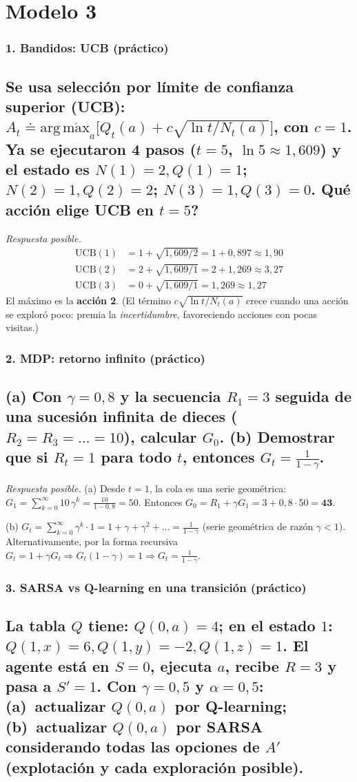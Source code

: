 \documentclass[11pt, a4paper]{article}
\newcommand{\pregunta}[1]{\subsection{#1}}
\newcommand{\eje}[1]{\subsubsection{#1}}
\newcommand{\argmax}{\operatorname*{arg\,m\acute{a}x}}
\begin{document}
\section{Modelo 3}

\eje{1. Bandidos: UCB (pr\'actico)}
\pregunta{Se usa selecci\'on por l\'imite de confianza superior (UCB): $A_t \doteq \argmax_a\big[Q_t(a) + c\sqrt{\ln t / N_t(a)}\big]$, con $c=1$. Ya se ejecutaron 4 pasos ($t=5$, $\ln 5 \approx 1{,}609$) y el estado es $N(1){=}2, Q(1){=}1$; $N(2){=}1, Q(2){=}2$; $N(3){=}1, Q(3){=}0$. \textquestiondown Qu\'e acci\'on elige UCB en $t=5$?}

\begin{respuesta}
\textit{Respuesta posible.}
\begin{align*}
\text{UCB}(1) &= 1 + \sqrt{1{,}609/2} = 1 + 0{,}897 \approx 1{,}90 \\
\text{UCB}(2) &= 2 + \sqrt{1{,}609/1} = 2 + 1{,}269 \approx 3{,}27 \\
\text{UCB}(3) &= 0 + \sqrt{1{,}609/1} = 1{,}269 \approx 1{,}27
\end{align*}
El m\'aximo es la \textbf{acci\'on 2}. (El t\'ermino $c\sqrt{\ln t/N_t(a)}$ crece cuando una acci\'on se explor\'o poco: premia la \emph{incertidumbre}, favoreciendo acciones con pocas visitas.)
\end{respuesta}

\eje{2. MDP: retorno infinito (pr\'actico)}
\pregunta{(a) Con $\gamma=0{,}8$ y la secuencia $R_1=3$ seguida de una sucesi\'on infinita de dieces ($R_2=R_3=\dots=10$), calcular $G_0$. (b) Demostrar que si $R_t=1$ para todo $t$, entonces $G_t = \frac{1}{1-\gamma}$.}

\begin{respuesta}
\textit{Respuesta posible.} (a) Desde $t=1$, la cola es una serie geom\'etrica: $G_1 = \sum_{k=0}^{\infty}10\,\gamma^{k} = \frac{10}{1-0{,}8}=50$. Entonces $G_0 = R_1 + \gamma G_1 = 3 + 0{,}8\cdot 50 = \mathbf{43}$.

(b) $G_t = \sum_{k=0}^{\infty}\gamma^{k}\cdot 1 = 1 + \gamma + \gamma^2 + \dots = \frac{1}{1-\gamma}$ (serie geom\'etrica de raz\'on $\gamma<1$). Alternativamente, por la forma recursiva $G_t = 1 + \gamma G_t \Rightarrow G_t(1-\gamma)=1 \Rightarrow G_t=\frac{1}{1-\gamma}$.
\end{respuesta}

\eje{3. SARSA vs Q-learning en una transici\'on (pr\'actico)}
\pregunta{La tabla $Q$ tiene: $Q(0,a)=4$; en el estado $1$: $Q(1,x)=6, Q(1,y)={-}2, Q(1,z)=1$. El agente est\'a en $S=0$, ejecuta $a$, recibe $R=3$ y pasa a $S'=1$. Con $\gamma=0{,}5$ y $\alpha=0{,}5$: (a)~actualizar $Q(0,a)$ por \textbf{Q-learning}; (b)~actualizar $Q(0,a)$ por \textbf{SARSA} considerando todas las opciones de $A'$ (explotaci\'on y cada exploraci\'on posible).}
\end{document}

